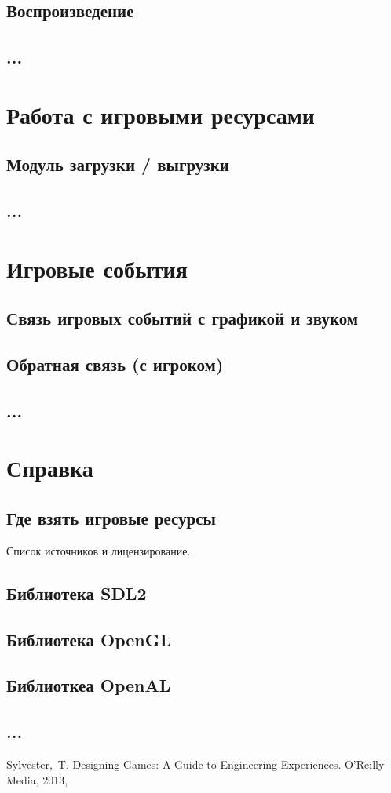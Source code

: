 \section{Воспроизведение}
\section{...}

\chapter{Работа с игровыми ресурсами}
\section{Модуль загрузки / выгрузки}
\section{...}

\chapter{Игровые события}
\section{Связь игровых событий с графикой и звуком}
\section{Обратная связь (с игроком)}
\section{...}

\chapter{Справка}
\section{Где взять игровые ресурсы}
Список источников и лицензирование.
\section{Библиотека SDL2}
\section{Библиотека OpenGL}
\section{Библиоткеа OpenAL}
\section{...}

\renewcommand{\bibname}{Список используемой литературы}
\begin{thebibliography}{10}
     Sylvester,~T. Designing Games: A Guide to Engineering Experiences. O'Reilly Media, 2013, 
\end{thebibliography}